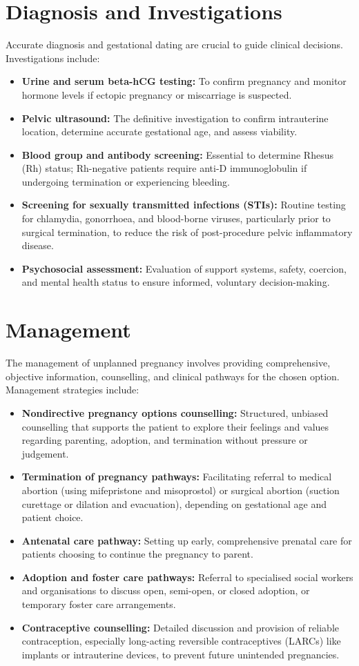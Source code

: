 \section*{Diagnosis and Investigations}
Accurate diagnosis and gestational dating are crucial to guide clinical decisions. Investigations include:
\begin{itemize}
    \item \textbf{Urine and serum beta-hCG testing:} To confirm pregnancy and monitor hormone levels if ectopic pregnancy or miscarriage is suspected.
    \item \textbf{Pelvic ultrasound:} The definitive investigation to confirm intrauterine location, determine accurate gestational age, and assess viability.
    \item \textbf{Blood group and antibody screening:} Essential to determine Rhesus (Rh) status; Rh-negative patients require anti-D immunoglobulin if undergoing termination or experiencing bleeding.
    \item \textbf{Screening for sexually transmitted infections (STIs):} Routine testing for chlamydia, gonorrhoea, and blood-borne viruses, particularly prior to surgical termination, to reduce the risk of post-procedure pelvic inflammatory disease.
    \item \textbf{Psychosocial assessment:} Evaluation of support systems, safety, coercion, and mental health status to ensure informed, voluntary decision-making.
\end{itemize}

\section*{Management}
The management of unplanned pregnancy involves providing comprehensive, objective information, counselling, and clinical pathways for the chosen option. Management strategies include:
\begin{itemize}
    \item \textbf{Nondirective pregnancy options counselling:} Structured, unbiased counselling that supports the patient to explore their feelings and values regarding parenting, adoption, and termination without pressure or judgement.
    \item \textbf{Termination of pregnancy pathways:} Facilitating referral to medical abortion (using mifepristone and misoprostol) or surgical abortion (suction curettage or dilation and evacuation), depending on gestational age and patient choice.
    \item \textbf{Antenatal care pathway:} Setting up early, comprehensive prenatal care for patients choosing to continue the pregnancy to parent.
    \item \textbf{Adoption and foster care pathways:} Referral to specialised social workers and organisations to discuss open, semi-open, or closed adoption, or temporary foster care arrangements.
    \item \textbf{Contraceptive counselling:} Detailed discussion and provision of reliable contraception, especially long-acting reversible contraceptives (LARCs) like implants or intrauterine devices, to prevent future unintended pregnancies.
\end{itemize}

